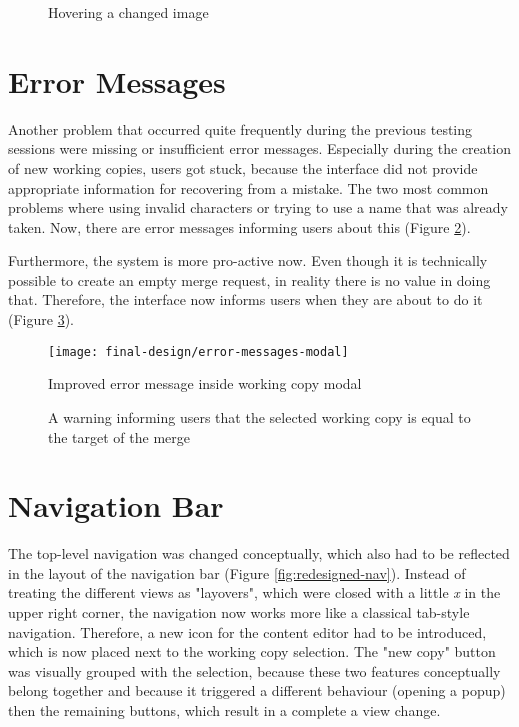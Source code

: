 \begin{figure}[h!]
 \centering
 \caption{Hovering a changed image}
 \label{fig:hover-changed-image}
\end{figure}


\section{Error Messages}
Another problem that occurred quite frequently during the previous testing sessions were missing or insufficient error messages. Especially during the creation of new working copies, users got stuck, because the interface did not provide appropriate information for recovering from a mistake. The two most common problems where using invalid characters or trying to use a name that was already taken. Now, there are error messages informing users about this (Figure \ref{fig:improv-error-messages}).

Furthermore, the system is more pro-active now. Even though it is technically possible to create an empty merge request, in reality there is no value in doing that. Therefore, the interface now informs users when they are about to do it (Figure \ref{fig:empty-merge-warning}).

\begin{figure}[h!]
 \centering
 \texttt{[image: final-design/error-messages-modal]}
 \caption{Improved error message inside working copy modal}
 \label{fig:improv-error-messages}
\end{figure}

\begin{figure}[h!]
 \centering
 \caption{A warning informing users that the selected working copy is equal to the target of the merge}
 \label{fig:empty-merge-warning}
\end{figure}

\section{Navigation Bar}
The top-level navigation was changed conceptually, which also had to be reflected in the layout of the navigation bar (Figure \ref{fig:redesigned-nav}). Instead of treating the different views as "layovers", which were closed with a little \textit{x} in the upper right corner, the navigation now works more like a classical tab-style navigation. Therefore, a new icon for the content editor had to be introduced, which is now placed next to the working copy selection. The "new copy" button was visually grouped with the selection, because these two features conceptually belong together and because it triggered a different behaviour (opening a popup) then the remaining buttons, which result in a complete a view change.

